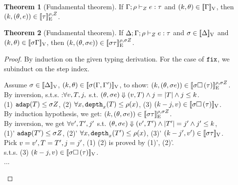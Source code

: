 \documentclass[a4paper,11pt]{article}
\theoremstyle{definition}
\newtheorem{thm}{Theorem}
\begin{document}
\begin{thm}[Fundamental theorem]
  If $\Gamma; \rho \vdash_{Z} e: \tau$ and $(k, \theta)
  \in [\![ \Gamma ]\!]_{\text{V}}$, then $(k, (\theta, e)) \in
  [\![ \tau ]\!]_{\text{E}}^{\rho, Z}$.
\end{thm}
{\color{red}
\begin{thm}[Fundamental theorem]
  If $\Delta; \Gamma; \rho \vdash_{Z} e: \tau$ and $ \sigma \in [\![ \Delta ]\!]_{\text{V}}$ and $(k, \theta)
  \in [\![ \sigma \Gamma ]\!]_{\text{V}}$, then $(k, (\theta, \sigma e)) \in
  [\![ \sigma \tau ]\!]_{\text{E}}^{\rho, \sigma Z}$.
\end{thm}%
}
\begin{proof}
By induction on the given typing derivation. For the case of
$\mathop{\mathtt{fix}}$, we subinduct on the step index.\\
\begin{mainitem} 
Assume $\sigma \in [\![ \Delta ]\!]_{\text{V}}$, $(k, \theta) \in [\![ \sigma (\Gamma, \Gamma') ]\!]_{\text{V}}$, to show: $(k, (\theta, \sigma e)) \in [\![ \sigma \mathtt{\square} \, (\tau) ]\!]_{\text{E}}^{\rho, \sigma Z}$.\\
%
By inversion, s.t.s. :$ \forall v, T, j, 
$ s.t. $ (\theta, \sigma e) \mathrel{\Downarrow} (v, T) \land j = |T| \land j \leq k $.  \\
(1) $\mathtt{adap}(T) \leq \sigma Z $, (2) $\forall x, \mathtt{depth}_{x}(T) \leq \rho(x)$, (3) $(k-j, v) \in [\![  \sigma \mathtt{\square} \, (\tau)  ]\!]_{\text{V}} $. \\
%
By induction hypothesis, we get: $(k, (\theta, \sigma e)) \in [\![ \sigma \tau ]\!]_{\text{E}}^{\rho, \sigma Z}$.\\
%
By inversion, we get $\forall v', T', j'$ s.t. $(\theta, \sigma e) \mathrel{\Downarrow} (v', T') \land |T'| = j' \land j' \leq k$,\\
(1)' $\mathtt{adap}(T') \leq \sigma Z$, (2)' $\forall x, \mathtt{depth}_{x}(T') \leq \rho(x)$, (3)' $(k - j', v') \in [\![ \sigma \tau ]\!]_{\text{V}}$.\\
%
Pick $v = v', T = T' , j = j'$, (1) (2) is proved by (1)', (2)'.\\
%
s.t.s. (3) $(k - j, v ) \in [\![ \sigma \mathtt{\square} \, (\tau) ]\!]_{\text{V}}$.\\
%
...\\


\end{mainitem}
\end{proof}
\end{document}
